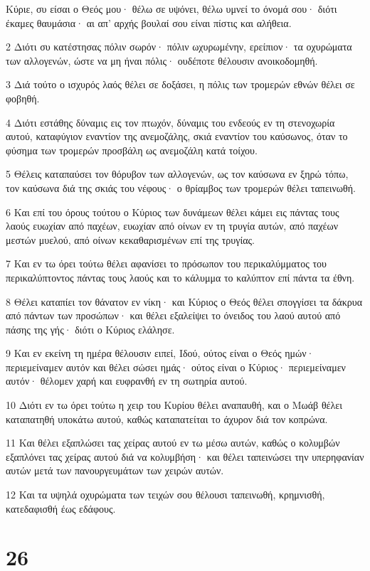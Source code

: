 \par Κύριε, συ είσαι ο Θεός μου· θέλω σε υψόνει, θέλω υμνεί το όνομά σου· διότι έκαμες θαυμάσια· αι απ' αρχής βουλαί σου είναι πίστις και αλήθεια.
\par 2 Διότι συ κατέστησας πόλιν σωρόν· πόλιν ωχυρωμένην, ερείπιον· τα οχυρώματα των αλλογενών, ώστε να μη ήναι πόλις· ουδέποτε θέλουσιν ανοικοδομηθή.
\par 3 Διά τούτο ο ισχυρός λαός θέλει σε δοξάσει, η πόλις των τρομερών εθνών θέλει σε φοβηθή.
\par 4 Διότι εστάθης δύναμις εις τον πτωχόν, δύναμις του ενδεούς εν τη στενοχωρία αυτού, καταφύγιον εναντίον της ανεμοζάλης, σκιά εναντίον του καύσωνος, όταν το φύσημα των τρομερών προσβάλη ως ανεμοζάλη κατά τοίχου.
\par 5 Θέλεις καταπαύσει τον θόρυβον των αλλογενών, ως τον καύσωνα εν ξηρώ τόπω, τον καύσωνα διά της σκιάς του νέφους· ο θρίαμβος των τρομερών θέλει ταπεινωθή.
\par 6 Και επί του όρους τούτου ο Κύριος των δυνάμεων θέλει κάμει εις πάντας τους λαούς ευωχίαν από παχέων, ευωχίαν από οίνων εν τη τρυγία αυτών, από παχέων μεστών μυελού, από οίνων κεκαθαρισμένων επί της τρυγίας.
\par 7 Και εν τω όρει τούτω θέλει αφανίσει το πρόσωπον του περικαλύμματος του περικαλύπτοντος πάντας τους λαούς και το κάλυμμα το καλύπτον επί πάντα τα έθνη.
\par 8 Θέλει καταπίει τον θάνατον εν νίκη· και Κύριος ο Θεός θέλει σπογγίσει τα δάκρυα από πάντων των προσώπων· και θέλει εξαλείψει το όνειδος του λαού αυτού από πάσης της γής· διότι ο Κύριος ελάλησε.
\par 9 Και εν εκείνη τη ημέρα θέλουσιν ειπεί, Ιδού, ούτος είναι ο Θεός ημών· περιεμείναμεν αυτόν και θέλει σώσει ημάς· ούτος είναι ο Κύριος· περιεμείναμεν αυτόν· θέλομεν χαρή και ευφρανθή εν τη σωτηρία αυτού.
\par 10 Διότι εν τω όρει τούτω η χειρ του Κυρίου θέλει αναπαυθή, και ο Μωάβ θέλει καταπατηθή υποκάτω αυτού, καθώς καταπατείται το άχυρον διά τον κοπρώνα.
\par 11 Και θέλει εξαπλώσει τας χείρας αυτού εν τω μέσω αυτών, καθώς ο κολυμβών εξαπλόνει τας χείρας αυτού διά να κολυμβήση· και θέλει ταπεινώσει την υπερηφανίαν αυτών μετά των πανουργευμάτων των χειρών αυτών.
\par 12 Και τα υψηλά οχυρώματα των τειχών σου θέλουσι ταπεινωθή, κρημνισθή, κατεδαφισθή έως εδάφους.

\chapter{26}

